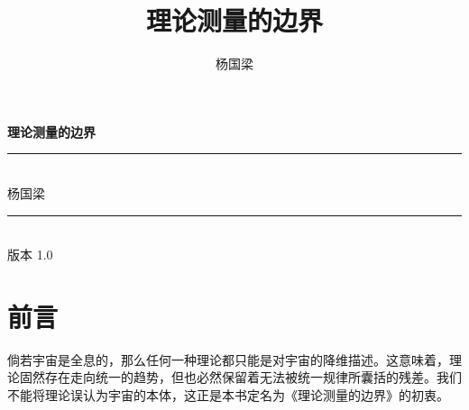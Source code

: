 \documentclass[
  chinese,
  a4paper,
  UTF8,
  12pt,
  oneside,
  openany]{ctexbook}
\title{理论测量的边界}
\author{杨国梁}
\date{}
\providecommand{\bookname}{理论测量的边界}
\let\maketitle\relax
\renewcommand*\contentsname{目录}
\newcommand\contentsname{目录}
\theoremstyle{plain}
\theoremstyle{plain}
\theoremstyle{plain}
\theoremstyle{definition}
\theoremstyle{plain}
\theoremstyle{plain}
\theoremstyle{remark}
\begin{document}
\frontmatter
\maketitle

\begin{titlepage}
    \thispagestyle{empty}
    \begin{center}
    \vspace*{2cm}
    {\Huge\bfseries\color{blue!50!black} \bookname}\\[0.6cm]
    \rule{\linewidth}{0.6pt}\\[1cm]
    {\Large 杨国梁}\\[1cm]
    \rule{\linewidth}{0.6pt}\\[2cm]
    \vfill
    {\large 版本 1.0}\\[0.5cm]
    \end{center}
\end{titlepage}
\cleardoublepage
\frontmatter

\renewcommand*\contentsname{目录}
{
\setcounter{tocdepth}{2}
\tableofcontents
}
\listoffigures
\listoftables

\mainmatter
{}

\chapter*{前言}\label{preface}


倘若宇宙是全息的，那么任何一种理论都只能是对宇宙的降维描述。这意味着，理论固然存在走向统一的趋势，但也必然保留着无法被统一规律所囊括的残差。我们不能将理论误认为宇宙的本体，这正是本书定名为《理论测量的边界》的初衷。
\end{document}
